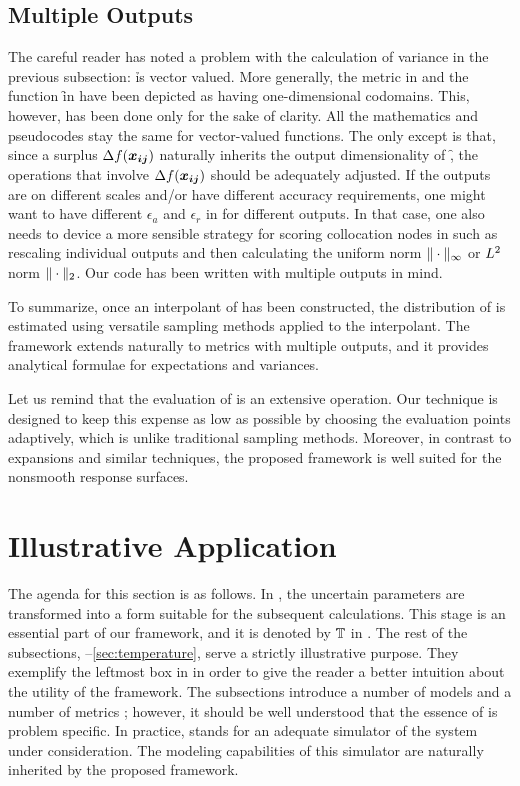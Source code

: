 \subsection{Multiple Outputs}

The careful reader has noted a problem with the calculation of variance in the
previous subsection: \h is vector valued. More generally, the metric \g in
 and the function \f in  have been depicted
as having one-dimensional codomains. This, however, has been done only for the
sake of clarity. All the mathematics and pseudocodes stay the same for
vector-valued functions. The only except is that, since a surplus
$\Delta\f(\vx_{\vi \vj})$ naturally inherits the output dimensionality of \f,
the operations that involve $\Delta\f(\vx_{\vi \vj})$ should be adequately
adjusted. If the outputs are on different scales and/or have different accuracy
requirements, one might want to have different $\epsilon_a$ and $\epsilon_r$ in
 for different outputs. In that case, one also needs to
device a more sensible strategy for scoring collocation nodes in 
such as rescaling individual outputs and then calculating the uniform norm
$\norm[\infty]{\cdot}$ or $\L{2}$ norm $\norm[2]{\cdot}$. Our code
\cite{sources} has been written with multiple outputs in mind.

To summarize, once an interpolant of \g has been constructed, the distribution
of \g is estimated using versatile sampling methods applied to the interpolant.
The framework extends naturally to metrics with multiple outputs, and it
provides analytical formulae for expectations and variances.

Let us remind that the evaluation of \g is an extensive operation. Our technique
is designed to keep this expense as low as possible by choosing the evaluation
points adaptively, which is unlike traditional sampling methods. Moreover, in
contrast to  expansions and similar techniques, the proposed framework is
well suited for the nonsmooth response surfaces.

\section{Illustrative Application}

The agenda for this section is as follows. In , the uncertain
parameters \vu are transformed into a form suitable for the subsequent
calculations. This stage is an essential part of our framework, and it is
denoted by $\transform$ in . The rest of the subsections,
--\ref{sec:temperature}, serve a strictly illustrative purpose. They
exemplify the leftmost box in  in order to give the reader a
better intuition about the utility of the framework. The subsections introduce a
number of models and a number of metrics \g; however, it should be well
understood that the essence of \g is problem specific. In practice, \g stands
for an adequate simulator of the system under consideration. The modeling
capabilities of this simulator are naturally inherited by the proposed
framework.

